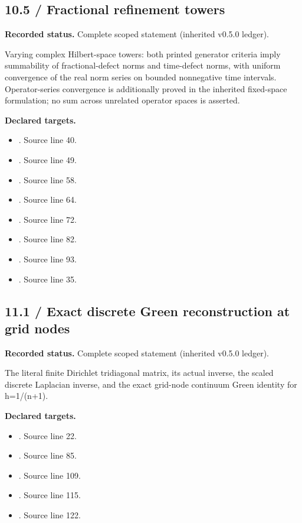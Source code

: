 \subsection{10.5 / Fractional refinement towers}
\label{result:10.5}
\textbf{Recorded status.} Complete scoped statement (inherited v0.5.0 ledger).\par
Varying complex Hilbert-space towers: both printed generator criteria imply summability of fractional-defect norms and time-defect norms, with uniform convergence of the real norm series on bounded nonnegative time intervals. Operator-series convergence is additionally proved in the inherited fixed-space formulation; no sum across unrelated operator spaces is asserted.

\textbf{Declared targets.}\begin{itemize}
\item {}. Source line 40.
\item {}. Source line 49.
\item {}. Source line 58.
\item {}. Source line 64.
\item {}. Source line 72.
\item {}. Source line 82.
\item {}. Source line 93.
\item {}. Source line 35.
\end{itemize}
\subsection{11.1 / Exact discrete Green reconstruction at grid nodes}
\label{result:11.1}
\textbf{Recorded status.} Complete scoped statement (inherited v0.5.0 ledger).\par
The literal finite Dirichlet tridiagonal matrix, its actual inverse, the scaled discrete Laplacian inverse, and the exact grid-node continuum Green identity for h=1/(n+1).

\textbf{Declared targets.}\begin{itemize}
\item {}. Source line 22.
\item {}. Source line 85.
\item {}. Source line 109.
\item {}. Source line 115.
\item {}. Source line 122.
\end{itemize}
